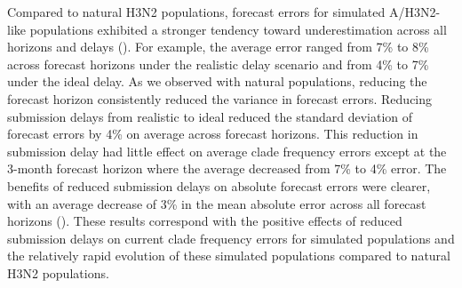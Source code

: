 \documentclass[9pt,lineno]{elife}
\begin{document}
Compared to natural H3N2 populations, forecast errors for simulated A/H3N2-like populations exhibited a stronger tendency toward underestimation across all horizons and delays ().
For example, the average error ranged from 7\% to 8\% across forecast horizons under the realistic delay scenario and from 4\% to 7\% under the ideal delay.
As we observed with natural populations, reducing the forecast horizon consistently reduced the variance in forecast errors.
Reducing submission delays from realistic to ideal reduced the standard deviation of forecast errors by 4\% on average across forecast horizons.
This reduction in submission delay had little effect on average clade frequency errors except at the 3-month forecast horizon where the average decreased from 7\% to 4\% error.
The benefits of reduced submission delays on absolute forecast errors were clearer, with an average decrease of 3\% in the mean absolute error across all forecast horizons ().
These results correspond with the positive effects of reduced submission delays on current clade frequency errors for simulated populations and the relatively rapid evolution of these simulated populations compared to natural H3N2 populations.
\end{document}
